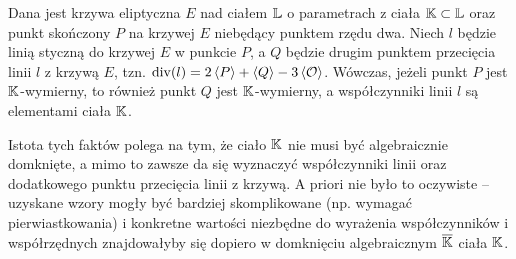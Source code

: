 \begin{fact}
Dana jest krzywa eliptyczna $E$ nad ciałem $\mathbb{L}$
o parametrach z ciała $\mathbb{K} \subset \mathbb{L}$
oraz punkt skończony $P$ na krzywej $E$ niebędący punktem rzędu dwa.
Niech $l$ będzie linią styczną do krzywej $E$ w punkcie $P$,
a $Q$ będzie drugim punktem przecięcia linii $l$ z krzywą $E$,
tzn. $\operatorname{div}(l) = 2\left\langle P\right\rangle + \left\langle Q\right\rangle - 3\left\langle\mathcal{O}\right\rangle$.
Wówczas, jeżeli punkt $P$ jest $\mathbb{K}$-wymierny,
to również punkt $Q$ jest $\mathbb{K}$-wymierny,
a współczynniki linii $l$ są elementami ciała $\mathbb{K}$.
\end{fact}

\noindent
Istota tych faktów polega na tym,
że ciało $\mathbb{K}$ nie musi być algebraicznie domknięte,
a mimo to zawsze da się wyznaczyć współczynniki linii
oraz dodatkowego punktu przecięcia linii z krzywą.
A priori nie było to oczywiste --
uzyskane wzory mogły być bardziej skomplikowane (np. wymagać pierwiastkowania)
i konkretne wartości niezbędne do wyrażenia współczynników i współrzędnych
znajdowałyby się dopiero w domknięciu algebraicznym $\overline{\mathbb{K}}$
ciała $\mathbb{K}$.
